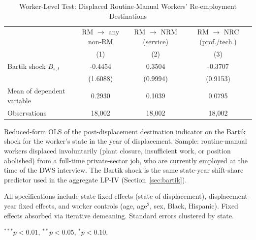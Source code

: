 \begin{table}[htbp]
\centering
\caption{Worker-Level Test: Displaced Routine-Manual Workers' Re-employment Destinations}
\label{tab:dws}
\small
\begin{threeparttable}
\begin{tabular}{lccc}
\hline\hline
                                  & RM $\to$ any non-RM    & RM $\to$ NRM (service)  & RM $\to$ NRC (prof./tech.) \\
                                  & (1)                    & (2)                     & (3)                        \\
\hline
Bartik shock $B_{s,t}$            & -0.4454 & 0.3504 & -0.3707 \\
                                  & (1.6088)  & (0.9994)     & (0.9153)        \\[3pt]
\hline
Mean of dependent variable        & 0.2930 & 0.1039 & 0.0795 \\
Observations                      & 18,002 & 18,002 & 18,002 \\
\hline\hline
\end{tabular}
\begin{tablenotes}\footnotesize
\item Reduced-form OLS of the post-displacement destination indicator on the
Bartik shock for the worker's state in the year of displacement. Sample:
routine-manual workers displaced involuntarily (plant closure, insufficient
work, or position abolished) from a full-time private-sector job, who are
currently employed at the time of the DWS interview. The Bartik shock is the
same state-year shift-share predictor used in the aggregate LP-IV
(Section~\ref{sec:bartik}).
\item All specifications include state fixed effects (state of displacement),
displacement-year fixed effects, and worker controls (age, age$^2$, sex,
Black, Hispanic). Fixed effects absorbed via iterative demeaning. Standard
errors clustered by state.
\item $^{***} p < 0.01$, $^{**} p < 0.05$, $^{*} p < 0.10$.
\end{tablenotes}
\end{threeparttable}
\end{table}
